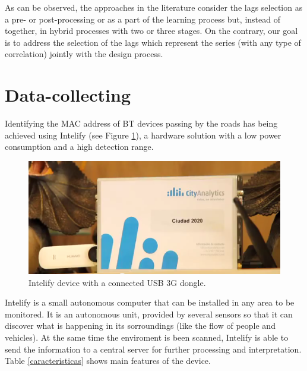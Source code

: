 \documentclass[preprint,authoryear,12pt]{elsarticle}
\begin{document}
As can be observed, the approaches in the literature consider the lags selection as a pre- or post-processing or as a part of the learning process but, instead of together, in hybrid processes with two or three stages. On the contrary, our goal is to address the selection of the lags which represent the series (with any type of correlation) jointly with the design process.




\section{Data-collecting}
\label{sec:data}

Identifying the MAC address of BT devices passing by the roads has being achieved using Intelify (see Figure \ref{intelify}), a hardware solution with a low power consumption and a high detection range.

\begin{figure}[htpb] 
\begin{center} 
\includegraphics[scale=0.5]{intelifychisme1.png}
\end{center} 
\caption{Intelify device with a connected USB 3G dongle.} 
\label{intelify} 
\end{figure}

Intelify is a small autonomous computer that can be installed in any area to be monitored. It is an autonomous unit, provided by several sensors so that it can discover what is happening in its sorroundings (like the flow of people and vehicles). At the same time the enviroment is been scanned, Intelify is able to send the information to a central server for further processing and interpretation. Table \ref{caracteristicas} shows main features of the device.
\end{document}

